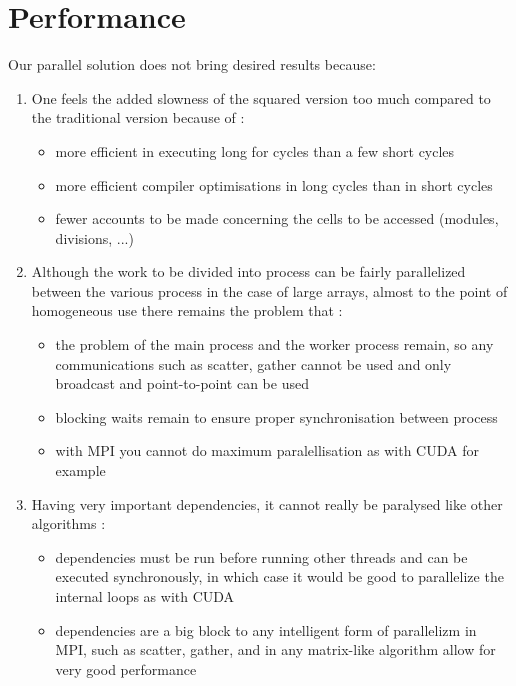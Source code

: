 \section{Performance}\label{performance}

Our parallel solution does not bring desired results because:
\begin{enumerate}
    \item \label{overhead-squared} One feels the added slowness of the squared version too much compared to the traditional version because of \cite{rucci}: 
    \begin{itemize}
        \item more efficient in executing long for cycles than a few short cycles
        \item more efficient compiler optimisations in long cycles than in short cycles
        \item fewer accounts to be made concerning the cells to be accessed (modules, divisions, ...)
    \end{itemize}
    \item \label{overhead-mpi} Although the work to be divided into process can be fairly parallelized between the various process in the case of large arrays, almost to the point of homogeneous use there remains the problem that \cite{koallen}:
    \begin{itemize}
        \item the problem of the main process and the worker process remain, so any communications such as scatter, gather cannot be used and only broadcast and point-to-point can be used
        \item blocking waits remain to ensure proper synchronisation between process
        \item with MPI you cannot do maximum paralellisation as with CUDA for example
    \end{itemize}
    \item \label{overhead-dependencies} Having very important dependencies, it cannot really be paralysed like other algorithms \cite{rucci}:
    \begin{itemize}
        \item dependencies must be run before running other threads and can be executed synchronously, in which case it would be good to parallelize the internal loops as with CUDA
        \item dependencies are a big block to any intelligent form of parallelizm in MPI, such as scatter, gather, and in any matrix-like algorithm allow for very good performance

\end{itemize}
\end{enumerate}
